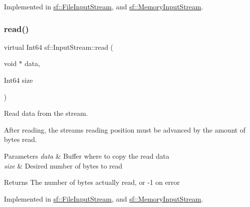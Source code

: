 Implemented in \mbox{\hyperlink{classsf_1_1_file_input_stream_aabdcaa315e088e008eeb9711ecc796e8}{sf\+::\+File\+Input\+Stream}}, and \mbox{\hyperlink{classsf_1_1_memory_input_stream_a6ade3ca45de361ffa0a718595f0b6763}{sf\+::\+Memory\+Input\+Stream}}.

\mbox{\label{classsf_1_1_input_stream_a8dd89c74c1acb693203f50e750c6ae53}} 
\subsubsection{\texorpdfstring{read()}{read()}}
{\footnotesize\ttfamily virtual Int64 sf\+::\+Input\+Stream\+::read (\begin{DoxyParamCaption}\item[{void $\ast$}]{data,  }\item[{Int64}]{size }\end{DoxyParamCaption})\hspace{0.3cm}{\ttfamily [pure virtual]}}



Read data from the stream. 

After reading, the stream\textquotesingle{}s reading position must be advanced by the amount of bytes read.


\begin{DoxyParams}{Parameters}
{\em data} & Buffer where to copy the read data \\
\hline
{\em size} & Desired number of bytes to read\\
\hline
\end{DoxyParams}
\begin{DoxyReturn}{Returns}
The number of bytes actually read, or -\/1 on error \begin{DoxyVerb}\end{DoxyVerb}
 
\end{DoxyReturn}


Implemented in \mbox{\hyperlink{classsf_1_1_file_input_stream_ad1e94c4152429f485db224c44ee1eb50}{sf\+::\+File\+Input\+Stream}}, and \mbox{\hyperlink{classsf_1_1_memory_input_stream_adff5270c521819639154d42d76fd4c34}{sf\+::\+Memory\+Input\+Stream}}.

\mbox{\label{classsf_1_1_input_stream_a76aba8e5d5cf9b1c5902d5e04f7864fc}} 
